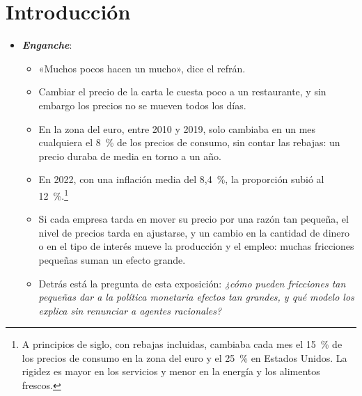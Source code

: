 \documentclass[11pt]{article}
\begin{document}
\tceetitulo

\section*{Introducción}

\begin{itemize}
\item \textbf{\emph{Enganche}}:
  \begin{itemize}
  \item «Muchos pocos hacen un mucho», dice el refrán.
  \item Cambiar el precio de la carta le cuesta poco a un restaurante, y sin embargo los precios no se mueven todos los días.
  \item En la zona del euro, entre 2010 y 2019, solo cambiaba en un mes cualquiera el 8~\% de los precios de consumo, sin contar las rebajas: un precio duraba de media en torno a un año\nocite{GautierEtAl2026WP3181}.
  \item En 2022, con una inflación media del 8,4~\%, la proporción subió al 12~\%\nocite{GautierEtAl2026WP3181,Eurostat2026IAPC}.\footnote{A principios de siglo, con rebajas incluidas, cambiaba cada mes el 15~\% de los precios de consumo en la zona del euro y el 25~\% en Estados Unidos\nocite{DhyneEtAl2006Price}. La rigidez es mayor en los servicios y menor en la energía y los alimentos frescos.}
  \item Si cada empresa tarda en mover su precio por una razón tan pequeña, el nivel de precios tarda en ajustarse, y un cambio en la cantidad de dinero o en el tipo de interés mueve la producción y el empleo: muchas fricciones pequeñas suman un efecto grande.
  \item Detrás está la pregunta de esta exposición: \emph{¿cómo pueden fricciones tan pequeñas dar a la política monetaria efectos tan grandes, y qué modelo los explica sin renunciar a agentes racionales?}
  \end{itemize}


\end{itemize}
\end{document}
